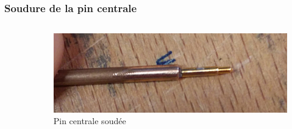 \documentclass[8pt,a9paper]{beamer} \usepackage[utf8]{inputenc} \usepackage[francais]{babel} \usepackage[T1]{fontenc}
\begin{document}
\begin{frame}
\frametitle{Soudure de la pin centrale}
\begin{columns}
\begin{column}{0.5\textwidth}
    \begin{description}
        \item[]~\\
    \end{description}
\end{column}
\begin{column}{0.5\textwidth}
\begin{figure}[h]
    \begin{center}
        \includegraphics[width=\textwidth]{Images/Coax/3}
        \caption{Pin centrale soudée}
    \end{center}
\end{figure}
\end{column}
\end{columns}
\end{frame}
\end{document}
